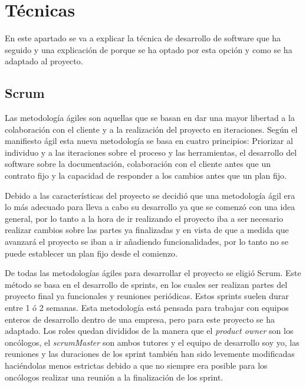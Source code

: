 
\section{Técnicas}

En este apartado se va a explicar la técnica de desarrollo de software que ha seguido y una explicación de porque se ha optado por esta opción y como se ha adaptado al proyecto.

\subsection{Scrum}

Las metodología ágiles son aquellas que se basan en dar una mayor libertad a la colaboración con el cliente y a la realización del proyecto en iteraciones. Según el manifiesto ágil esta nueva metodología se basa en cuatro principios: Priorizar al individuo y a las iteraciones sobre el proceso y las herramientas, el desarrollo del software sobre la documentación, colaboración con el cliente antes que un contrato fijo y la capacidad de responder a los cambios antes que un plan fijo\cite{metodologia_agil}.

Debido a las características del proyecto se decidió que una metodología ágil era lo más adecuado para lleva a cabo su desarrollo ya que se comenzó con una idea general, por lo tanto a la hora de ir realizando el proyecto iba a ser necesario realizar cambios sobre las partes ya finalizadas y en vista de que a medida que avanzará el proyecto se iban a ir añadiendo funcionalidades, por lo tanto no se puede establecer un plan fijo desde el comienzo\cite{metodologia_agil}.

De todas las metodologías ágiles para desarrollar el proyecto se eligió Scrum. Este método se basa en el desarrollo de sprints, en los cuales ser realizan partes del proyecto final ya funcionales y reuniones periódicas. Estos sprints suelen durar entre 1 ó 2 semanas\cite{scrum}. Esta metodología está pensada para trabajar con equipos enteros de desarrollo dentro de una empresa, pero para este proyecto se ha adaptado. Los roles quedan divididos de la manera que el \textit{product owner} son los oncólogos, el \textit{scrumMaster} son ambos tutores y el equipo de desarrollo soy yo, las reuniones y las duraciones de los sprint también han sido levemente modificadas haciéndolas menos estrictas debido a que no siempre era posible para los oncólogos realizar una reunión a la finalización de los sprint.

